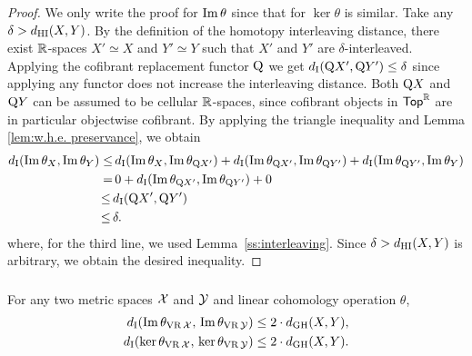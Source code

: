 \begin{proof}
	We only write the proof for $\operatorname{Im}\theta$ since that for $\ker\theta$ is similar.
	Take any $\delta > d_{\mathrm{HI}}(X,Y)$.
	By the definition of the homotopy interleaving distance, there exist $\mathbb{R}$-spaces $X' \simeq X$ and $Y' \simeq Y$ such that $X'$ and $Y'$ are $\delta$-interleaved.
	Applying the cofibrant replacement functor $\mathrm{Q}$ we get $d_{\mathrm{I}}(\mathrm{Q} X', \mathrm{Q} Y') \leq \delta$ since applying any functor does not increase the interleaving distance.
	Both $\mathrm{Q} X$ and $\mathrm{Q} Y$ can be assumed to be cellular $\mathbb{R}$-spaces, since cofibrant objects in $\mathsf{Top}^{\mathbb{R}}$ are in particular objectwise cofibrant.
	By applying the triangle inequality and Lemma \ref{lem:w.h.e. preservance}, we obtain
	\begin{align*}
		d_{\mathrm{I}}(\operatorname{Im}\theta_{X}, \operatorname{Im}\theta_{Y}) \leq& \,
		d_{\mathrm{I}}(\operatorname{Im}\theta_{X}, \operatorname{Im}\theta_{\mathrm{Q} X'}) + d_{\mathrm{I}}(\operatorname{Im}\theta_{\mathrm{Q} X'}, \operatorname{Im}\theta_{\mathrm{Q} Y'}) + d_{\mathrm{I}}(\operatorname{Im}\theta_{\mathrm{Q} Y'}, \operatorname{Im}\theta_{Y}) \\ =& \, 
		0 + d_{\mathrm{I}}(\operatorname{Im}\theta_{\mathrm{Q} X'}, \operatorname{Im}\theta_{\mathrm{Q} Y'}) + 0 \\ \leq \,&
		d_{\mathrm{I}}(\mathrm{Q} X', \mathrm{Q} Y') \\ \leq \,&
		\delta.
	\end{align*}
	where, for the third line, we used Lemma~\ref{ss:interleaving}.
 	Since $\delta > d_{\mathrm{HI}}(X,Y)$ is arbitrary, we obtain the desired inequality.
\end{proof}

\subsubsection{}\label{cor:theta stability VR}

\corollary For any two metric spaces $\mathcal{X}$ and $\mathcal{Y}$ and linear cohomology operation $\theta$,
\begin{align*}
	d_{\mathrm{I}}(\operatorname{Im}\theta_{\operatorname{VR}\mathcal{X}},\, \operatorname{Im}\theta_{\operatorname{VR}\mathcal{Y}}) \leq 2 \cdot d_{\mathrm{GH}}(X,Y), \\
	d_{\mathrm{I}}(\ker\theta_{\operatorname{VR}\mathcal{X}},\, \ker\theta_{\operatorname{VR}\mathcal{Y}}) \leq 2 \cdot d_{\mathrm{GH}}(X,Y).
\end{align*}

